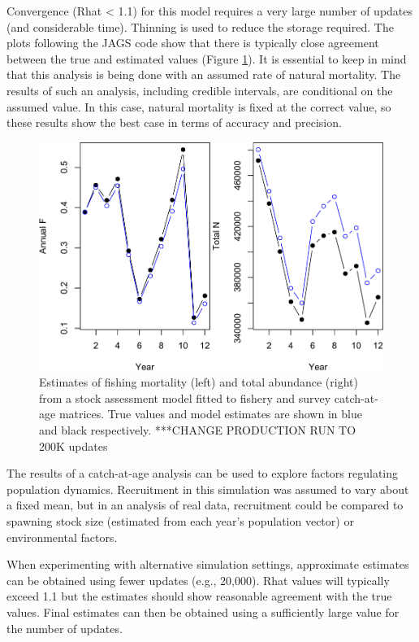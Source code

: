 \documentclass[
]{krantz}
\begin{document}
Convergence (Rhat \textless{} 1.1) for this model requires a very large number of updates (and considerable time). Thinning is used to reduce the storage required. The plots following the JAGS code show that there is typically close agreement between the true and estimated values (Figure \ref{fig:CAGEANPlot}). It is essential to keep in mind that this analysis is being done with an assumed rate of natural mortality. The results of such an analysis, including credible intervals, are conditional on the assumed value. In this case, natural mortality is fixed at the correct value, so these results show the best case in terms of accuracy and precision.

\begin{figure}
\includegraphics[width=0.9\linewidth]{bookdown_files/figure-latex/CAGEANPlot-1} \caption{Estimates of fishing mortality (left) and total abundance (right) from a stock assessment model fitted to fishery and survey catch-at-age matrices. True values and model estimates are shown in blue and black respectively. ***CHANGE PRODUCTION RUN TO 200K updates}\label{fig:CAGEANPlot}
\end{figure}

The results of a catch-at-age analysis can be used to explore factors regulating population dynamics. Recruitment in this simulation was assumed to vary about a fixed mean, but in an analysis of real data, recruitment could be compared to spawning stock size (estimated from each year's population vector) or environmental factors.

When experimenting with alternative simulation settings, approximate estimates can be obtained using fewer updates (e.g., 20,000). Rhat values will typically exceed 1.1 but the estimates should show reasonable agreement with the true values. Final estimates can then be obtained using a sufficiently large value for the number of updates.
\end{document}
